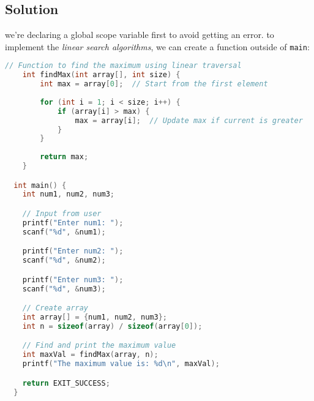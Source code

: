 \documentclass{article}
\begin{document}
  \begin{center}
  \end{center}

  \subsection{Solution}

  we're declaring a global scope variable first to avoid getting an error.
  to implement the \textit{linear search algorithms}, we can create a function outside of \texttt{main}:

  \begin{lstlisting}[language=C, caption=findMax function]
    // Function to find the maximum using linear traversal
    int findMax(int array[], int size) {
        int max = array[0];  // Start from the first element
    
        for (int i = 1; i < size; i++) {
            if (array[i] > max) {
                max = array[i];  // Update max if current is greater
            }
        }
    
        return max;
    }

  int main() {
    int num1, num2, num3;

    // Input from user
    printf("Enter num1: ");
    scanf("%d", &num1);

    printf("Enter num2: ");
    scanf("%d", &num2);

    printf("Enter num3: ");
    scanf("%d", &num3);

    // Create array
    int array[] = {num1, num2, num3};
    int n = sizeof(array) / sizeof(array[0]);

    // Find and print the maximum value
    int maxVal = findMax(array, n);
    printf("The maximum value is: %d\n", maxVal);

    return EXIT_SUCCESS;
  }
 
  \end{lstlisting}
\end{document}
